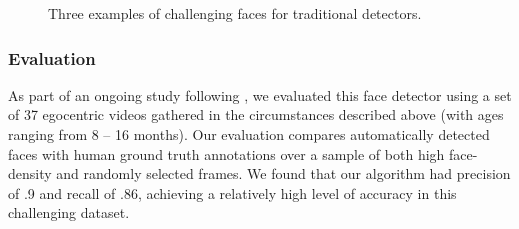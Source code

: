 \documentclass[10pt,letterpaper]{article}
\begin{document}
\begin{figure}[t]
    \caption{Three examples of challenging faces for traditional detectors.}
\label{fig:faces}
\end{figure}

\subsubsection{Evaluation}

As part of an ongoing study following , we evaluated this face detector using a set of 37 egocentric videos gathered in the circumstances described above (with ages ranging from 8 -- 16 months).  Our evaluation compares automatically detected faces with human ground truth annotations over a sample of both high face-density and randomly selected frames. We found that our algorithm had precision of .9 and recall of .86, achieving a relatively high level of accuracy in this challenging dataset. 




\end{document}
